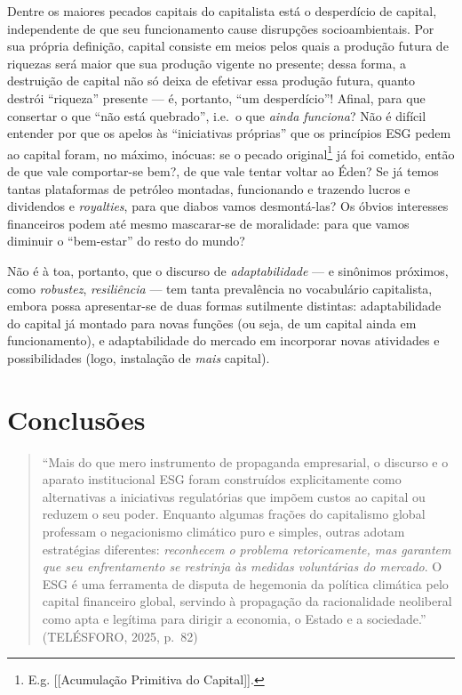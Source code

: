 Dentre os maiores pecados capitais do capitalista está o desperdício de
capital, independente de que seu funcionamento cause disrupções
socioambientais. Por sua própria definição, capital consiste em meios
pelos quais a produção futura de riquezas será maior que sua produção
vigente no presente; dessa forma, a destruição de capital não só deixa
de efetivar essa produção futura, quanto destrói ``riqueza'' presente
--- é, portanto, ``um desperdício''! Afinal, para que consertar o que
``não está quebrado'', i.e.~o que \emph{ainda funciona}? Não é difícil
entender por que os apelos às ``iniciativas próprias'' que os princípios
ESG pedem ao capital foram, no máximo, inócuas: se o pecado
original\footnote{E.g. {[}{[}Acumulação Primitiva do Capital{]}{]}.} já
foi cometido, então de que vale comportar-se bem?, de que vale tentar
voltar ao Éden? Se já temos tantas plataformas de petróleo montadas,
funcionando e trazendo lucros e dividendos e \emph{royalties}, para que
diabos vamos desmontá-las? Os óbvios interesses financeiros podem até
mesmo mascarar-se de moralidade: para que vamos diminuir o ``bem-estar''
do resto do mundo?

Não é à toa, portanto, que o discurso de \emph{adaptabilidade} --- e
sinônimos próximos, como \emph{robustez}, \emph{resiliência} --- tem
tanta prevalência no vocabulário capitalista, embora possa apresentar-se
de duas formas sutilmente distintas: adaptabilidade do capital já
montado para novas funções (ou seja, de um capital ainda em
funcionamento), e adaptabilidade do mercado em incorporar novas
atividades e possibilidades (logo, instalação de \emph{mais} capital).

\hypertarget{conclusuxf5es}{%
\section{Conclusões}\label{conclusuxf5es}}

\begin{quote}
``Mais do que mero instrumento de propaganda empresarial, o discurso e o
aparato institucional ESG foram construídos explicitamente como
alternativas a iniciativas regulatórias que impõem custos ao capital ou
reduzem o seu poder. Enquanto algumas frações do capitalismo global
professam o negacionismo climático puro e simples, outras adotam
estratégias diferentes: \emph{reconhecem o problema retoricamente, mas
garantem que seu enfrentamento se restrinja às medidas voluntárias do
mercado}. O ESG é uma ferramenta de disputa de hegemonia da política
climática pelo capital financeiro global, servindo à propagação da
racionalidade neoliberal como apta e legítima para dirigir a economia, o
Estado e a sociedade.'' (TELÉSFORO, 2025, p.~82)
\end{quote}

